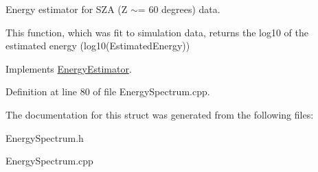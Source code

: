 Energy estimator for SZA (Z $\sim$= 60 degrees) data. 

This function, which was fit to simulation data, returns the log10 of the estimated energy (log10(EstimatedEnergy)) 

Implements \hyperlink{structEnergyEstimator}{EnergyEstimator}.



Definition at line 80 of file EnergySpectrum.cpp.



The documentation for this struct was generated from the following files:\begin{DoxyCompactItemize}
\item 
EnergySpectrum.h\item 
EnergySpectrum.cpp\end{DoxyCompactItemize}
